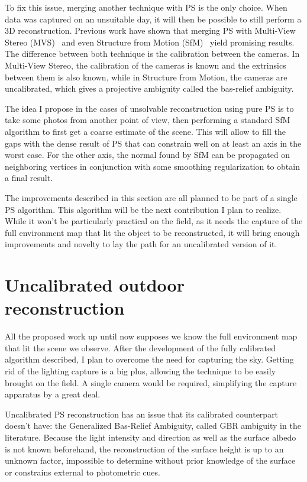 To fix this issue, merging another technique with PS is the only choice. When data was captured on an unsuitable day, it will then be possible to still perform a 3D reconstruction. Previous work have shown that merging PS with Multi-View Stereo (MVS)~\cite{Beljan2012,Zhou2013,ackermann-3dv-14,HernandezEsteban2008,inose-tcva-13,shi-3dv-14} and even Structure from Motion (SfM)~\cite{zhang-iccv-03,lim-iccv-05} yield promising results. The difference between both technique is the calibration between the cameras. In Multi-View Stereo, the calibration of the cameras is known and the extrinsics between them is also known, while in Structure from Motion, the cameras are uncalibrated, which gives a projective ambiguity called the bas-relief ambiguity.

The idea I propose in the cases of unsolvable reconstruction using pure PS is to take some photos from another point of view, then performing a standard SfM algorithm to first get a coarse estimate of the scene. This will allow to fill the gaps with the dense result of PS that can constrain well on at least an axis in the worst case. For the other axis, the normal found by SfM can be propagated on neighboring vertices in conjunction with some smoothing regularization to obtain a final result.

The improvements described in this section are all planned to be part of a single PS algorithm. This algorithm will be the next contribution I plan to realize. While it won't be particularly practical on the field, as it needs the capture of the full environment map that lit the object to be reconstructed, it will bring enough improvements and novelty to lay the path for an uncalibrated version of it.

\section{Uncalibrated outdoor reconstruction}
\label{sec:uncalib}

All the proposed work up until now supposes we know the full environment map that lit the scene we observe. After the development of the fully calibrated algorithm described, I plan to overcome the need for capturing the sky. Getting rid of the lighting capture is a big plus, allowing the technique to be easily brought on the field. A single camera would be required, simplifying the capture apparatus by a great deal.

Uncalibrated PS reconstruction has an issue that its calibrated counterpart doesn't have: the Generalized Bas-Relief Ambiguity, called GBR ambiguity in the literature. Because the light intensity and direction as well as the surface albedo is not known beforehand, the reconstruction of the surface height is up to an unknown factor, impossible to determine without prior knowledge of the surface or constrains external to photometric cues.

